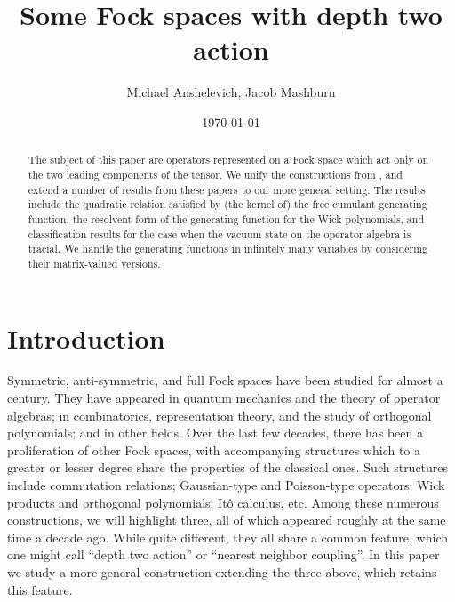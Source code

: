 \documentclass[12pt]{amsart}
\title{Some Fock spaces with depth two action}
\author{Michael Anshelevich, Jacob Mashburn}
\date{\today}
\theoremstyle{definition}
\begin{document}
\begin{abstract}
The subject of this paper are operators represented on a Fock space which act only on the two leading components of the tensor. We unify the constructions from \cite{AnsFree-Meixner,Lenczewski-Salapata-Kesten,Bozejko-Lytvynov-Meixner-I,Bozejko-Lytvynov-Meixner-II}, and extend a number of results from these papers to our more general setting. The results include the quadratic relation satisfied by (the kernel of) the free cumulant generating function, the resolvent form of the generating function for the Wick polynomials, and classification results for the case when the vacuum state on the operator algebra is tracial. We handle the generating functions in infinitely many variables by considering their matrix-valued versions.
\end{abstract}


\maketitle





\section{Introduction}

Symmetric, anti-symmetric, and full Fock spaces have been studied for almost a century. They have appeared in quantum mechanics and the theory of operator algebras; in combinatorics, representation theory, and the study of orthogonal polynomials; and in other fields. Over the last few decades, there has been a proliferation of other Fock spaces, with accompanying structures which to a greater or lesser degree share the properties of the classical ones. Such structures include commutation relations; Gaussian-type and Poisson-type operators; Wick products and orthogonal polynomials; It\^o calculus, etc. Among these numerous constructions, we will highlight three, all of which appeared roughly at the same time a decade ago. While quite different, they all share a common feature, which one might call ``depth two action'' or ``nearest neighbor coupling''. In this paper we study a more general construction extending the three above, which retains this feature.
\end{document}
